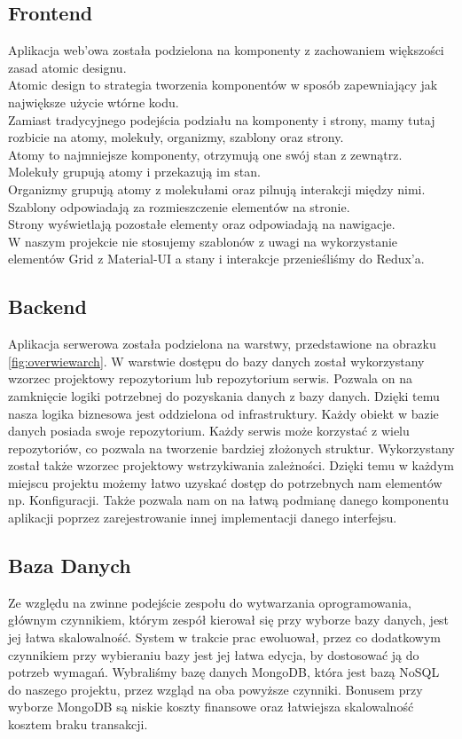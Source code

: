 \documentclass[a4paper,11pt]{report}
\begin{document}
\subsection{Frontend}
Aplikacja web'owa została podzielona na komponenty z zachowaniem większości zasad atomic designu.\\
Atomic design \cite{atomicdesign} to strategia tworzenia komponentów w sposób zapewniający jak największe użycie wtórne kodu.\\
Zamiast tradycyjnego podejścia podziału na komponenty i strony, mamy tutaj rozbicie na atomy, molekuły, organizmy, szablony oraz strony.\\
Atomy to najmniejsze komponenty, otrzymują one swój stan z zewnątrz.\\
Molekuły grupują atomy i przekazują im stan.\\
Organizmy grupują atomy z molekułami oraz pilnują interakcji między nimi.\\
Szablony odpowiadają za rozmieszczenie elementów na stronie.\\
Strony wyświetlają pozostałe elementy oraz odpowiadają na nawigacje.\\
W naszym projekcie nie stosujemy szablonów z uwagi na wykorzystanie elementów Grid z Material-UI a stany i interakcje przenieśliśmy do Redux'a.\\
\subsection{Backend}
Aplikacja serwerowa została podzielona na warstwy, przedstawione na obrazku \ref{fig:overwiewarch}.
W warstwie dostępu do bazy danych został wykorzystany wzorzec projektowy repozytorium lub repozytorium serwis.
Pozwala on na zamknięcie logiki potrzebnej do pozyskania danych z bazy danych.
Dzięki temu nasza logika biznesowa jest oddzielona od infrastruktury.
Każdy obiekt w bazie danych posiada swoje repozytorium.
Każdy serwis może korzystać z wielu repozytoriów, co pozwala na tworzenie bardziej złożonych struktur.
Wykorzystany został także wzorzec projektowy wstrzykiwania zależności.
Dzięki temu w każdym miejscu projektu możemy łatwo uzyskać dostęp do potrzebnych nam elementów np. Konfiguracji.
Także pozwala nam on na łatwą podmianę danego komponentu aplikacji poprzez zarejestrowanie innej implementacji danego interfejsu.\\
\subsection{Baza Danych}
Ze względu na zwinne podejście zespołu do wytwarzania oprogramowania, głównym czynnikiem, którym zespół kierował się przy wyborze bazy danych, jest jej łatwa skalowalność.
System w trakcie prac ewoluował, przez co dodatkowym czynnikiem przy wybieraniu bazy jest jej łatwa edycja, by dostosować ją do potrzeb wymagań. 
Wybraliśmy bazę danych MongoDB, która jest bazą NoSQL do naszego projektu, przez wzgląd na oba powyższe czynniki. Bonusem przy wyborze MongoDB są niskie koszty finansowe oraz łatwiejsza skalowalność kosztem braku transakcji.
\end{document}

